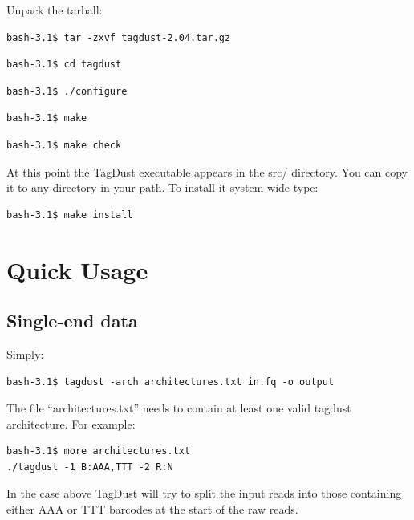\documentclass[11pt,a4paper,oneside]{book}
\begin{document}
Unpack the tarball:

\begin{verbatim}
bash-3.1$ tar -zxvf tagdust-2.04.tar.gz 
\end{verbatim}

\begin{verbatim}
bash-3.1$ cd tagdust
\end{verbatim}


\begin{verbatim}
bash-3.1$ ./configure
\end{verbatim}
\begin{verbatim}
bash-3.1$ make
\end{verbatim}

\begin{verbatim}
bash-3.1$ make check
\end{verbatim}
At this point the TagDust executable appears in the src/ directory. You can copy it to any directory in your path. To install it system wide type:  
\begin{verbatim}
bash-3.1$ make install
\end{verbatim}
\chapter{Quick Usage}

\section{Single-end data}

Simply:

\begin{verbatim}
bash-3.1$ tagdust -arch architectures.txt in.fq -o output
\end{verbatim}
The file ``architectures.txt'' needs to contain at least one valid tagdust architecture. For example: 
\begin{verbatim}
bash-3.1$ more architectures.txt
./tagdust -1 B:AAA,TTT -2 R:N 
\end{verbatim}

In the case above TagDust will try to split the input reads into those containing either AAA or TTT barcodes at the start of the raw reads. 
\end{document}
